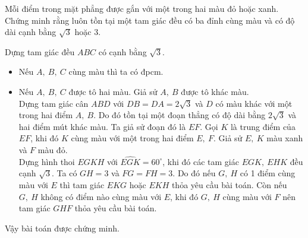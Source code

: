\begin{ex}%
    Mỗi điểm trong mặt phẳng được gắn với một trong hai màu đỏ hoặc xanh. Chứng minh rằng luôn tồn tại một tam giác đều có ba đỉnh cùng màu và có độ dài cạnh bằng $\sqrt{3}$ hoặc $3$.    
\loigiai
    {\begin{center}
    \end{center}
Dựng tam giác đều $ABC$ có cạnh bằng $\sqrt{3}$.
\begin{itemize}
\item Nếu $A,\ B,\ C$ cùng màu thì ta có đpcm.
\item Nếu $A,\ B,\ C$ được tô hai màu. Giả sử $A,\ B$ được tô khác màu.\\
Dựng tam giác cân $ABD$ với $DB=DA=2\sqrt{3}$ và $D$ có màu khác với một trong hai điểm $A,\ B$. Do đó tồn tại một đoạn thẳng có độ dài bằng $2\sqrt{3}$ và hai điểm mút khác màu. Ta giả sử đoạn đó là $EF$. Gọi $K$ là trung điểm của $EF$, khi đó $K$ cùng màu với một trong hai điểm $E,\ F$. Giả sử $E,\ K$ màu xanh và $F$ màu đỏ.\\
Dựng hình thoi $EGKH$ với $\widehat{EGK}=60^\circ$, khi đó các tam giác $EGK,\ EHK$ đều cạnh $\sqrt{3}$. Ta có $GH=3$ và $FG=FH=3$. Do đó nếu $G,\ H$ có 1 điểm cùng màu với $E$ thì tam giác $EKG$ hoặc $EKH$ thỏa yêu cầu bài toán. Còn nếu $G,\ H$ không có điểm nào cùng màu với $E$, khi đó $G,\ H$ cùng màu với $F$ nên tam giác $GHF$ thỏa yêu cầu bài toán.  
 
\end{itemize}
Vậy bài toán được chứng minh.
    }
\end{ex}

